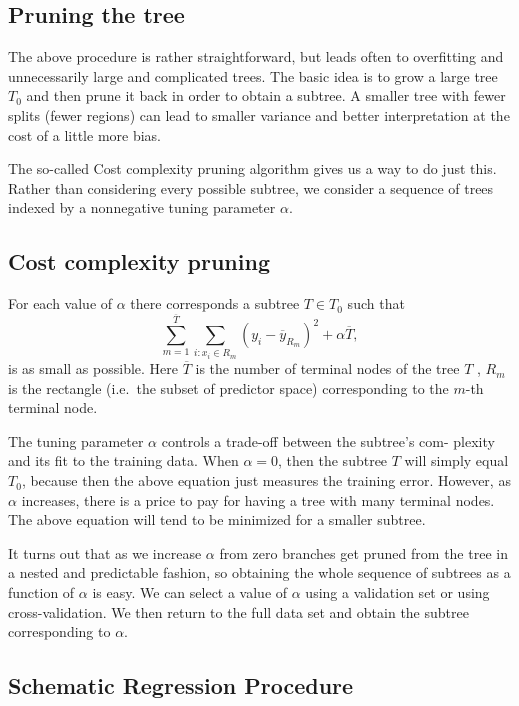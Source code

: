 \documentclass[%
oneside,                 %
final,                   %
10pt]{article}
\begin{document}
\subsection*{Pruning the tree}

The above procedure is rather straightforward, but leads often to
overfitting and unnecessarily large and complicated trees. The basic
idea is to grow a large tree $T_0$ and then prune it back in order to
obtain a subtree. A smaller tree with fewer splits (fewer regions) can
lead to smaller variance and better interpretation at the cost of a
little more bias.

The so-called Cost complexity pruning algorithm gives us a
way to do just this. Rather than considering every possible subtree,
we consider a sequence of trees indexed by a nonnegative tuning
parameter $\alpha$.

\subsection*{Cost complexity pruning}
For each value of $\alpha$  there corresponds a subtree $T \in T_0$ such that
\[
\sum_{m=1}^{\overline{T}}\sum_{i:x_i\in R_m}(y_i-\overline{y}_{R_m})^2+\alpha\overline{T},
\]
is as small as possible. Here $\overline{T}$ is 
the number of terminal nodes of the tree $T$ , $R_m$ is the
rectangle (i.e.~the subset of predictor space)  corresponding to the $m$-th terminal node.

The tuning parameter $\alpha$ controls a trade-off between the subtree’s
com- plexity and its fit to the training data. When $\alpha = 0$, then the
subtree $T$ will simply equal $T_0$, 
because then the above equation just measures the
training error. 
However, as $\alpha$ increases, there is a price to pay for
having a tree with many terminal nodes. The above equation will
tend to be minimized for a smaller subtree. 


It turns out that as we increase $\alpha$ from zero
branches get pruned from the tree in a nested and predictable fashion,
so obtaining the whole sequence of subtrees as a function of $\alpha$ is
easy. We can select a value of $\alpha$ using a validation set or using
cross-validation. We then return to the full data set and obtain the
subtree corresponding to $\alpha$. 


\subsection*{Schematic Regression Procedure}
\end{document}
